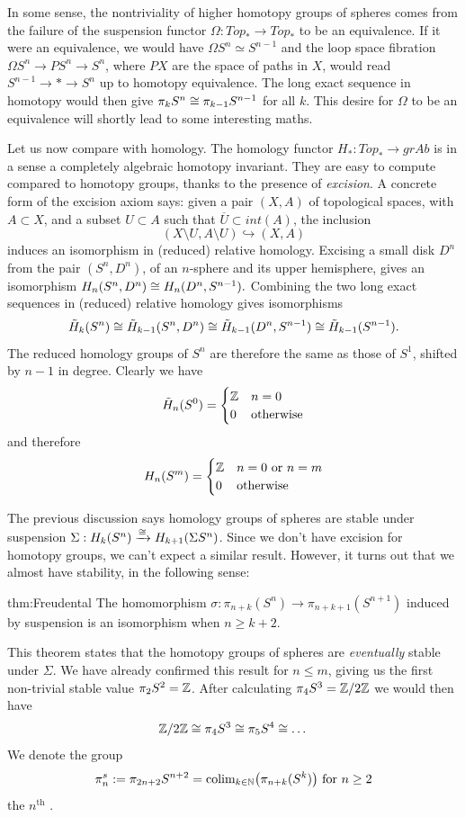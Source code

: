 In some sense, the nontriviality of higher homotopy groups of spheres comes from the failure of the suspension functor $\Omega:Top_*\rightarrow Top_*$ to be an equivalence. If it were an equivalence, we would have $\Omega S^n\simeq S^{n-1}$ and the loop space fibration $\Omega S^n\rightarrow PS^n\rightarrow S^n$, where $PX$ are the space of paths in $X$, would read $S^{n-1}\rightarrow *\rightarrow S^n$ up to homotopy equivalence. The long exact sequence in homotopy would then give $\pi_k S^n\cong \pi_{k-1}S^{n-1}$ for all $k$. This desire for $\Omega$ to be an equivalence will shortly lead to some interesting maths.

Let us now compare with homology. The homology functor $H_*:Top_*\rightarrow grAb$ is in a sense a completely algebraic homotopy invariant. They are easy to compute compared to homotopy groups, thanks to the presence of \textit{excision}. A concrete form of the excision axiom says: given a pair $(X,A)$ of topological spaces, with $A\subset X$, and a subset $U\subset A$ such that $\overline{U}\subset int(A)$, the inclusion $$(X\setminus U, A\setminus U) \hookrightarrow (X,A)$$ induces an isomorphism in (reduced) relative homology. Excising a small disk $D^n$ from the pair $(S^n, D^n)$, of an $n$-sphere and its upper hemisphere, gives an isomorphism $H_n(S^n,D^n)\cong H_n(D^n,S^{n-1}).$ Combining the two long exact sequences in (reduced) relative homology gives isomorphisms $$\tilde{H}_k(S^n)\cong \tilde{H}_{k-1}(S^n,D^n)\cong \tilde{H}_{k-1}(D^n,S^{n-1})\cong \tilde{H}_{k-1}(S^{n-1}).$$ The reduced homology groups of $S^n$ are therefore the same as those of $S^1$, shifted by $n-1$ in degree. Clearly we have $$\tilde{H}_n(S^0)=\begin{cases}\mathbb{Z}&n=0\\ 0&\text{otherwise}\end{cases}$$ and therefore
$$H_n(S^m)=\begin{cases}\mathbb{Z}& n=0 \text{ or } n=m\\ 0&\text{otherwise}\end{cases}$$

The previous discussion says homology groups of spheres are stable under suspension $\Sigma: H_k(S^n)\xrightarrow{\cong} H_{k+1}(\Sigma S^n)$. Since we don't have excision for homotopy groups, we can't expect a similar result. However, it turns out that we almost have stability, in the following sense:
\begin{theorem}{thm:Freudental}
The homomorphism $\sigma:\pi_{n+k}(S^n)\rightarrow \pi_{n+k+1}(S^{n+1})$ induced by suspension is an isomorphism when $n\geq k+2$.
\end{theorem}
This theorem states that the homotopy groups of spheres are \textit{eventually} stable under $\Sigma$. We have already confirmed this result for $n\leq m$, giving us the first non-trivial stable value $\pi_2S^2=\mathbb{Z}$. After calculating $\pi_4S^3=\mathbb{Z}/2\mathbb{Z}$ we would then have
$$\mathbb{Z}/2\mathbb{Z}\cong\pi_4S^3\cong\pi_5S^4\cong\dots$$
We denote the group $$\pi_n^s:=\pi_{2n+2}S^{n+2}={\text{colim}}_{k\in \mathbb{N}}\big(\pi_{n+k}(S^k)\big) \text{ for } n\geq 2$$ the $n^{\text{th}}$ .

